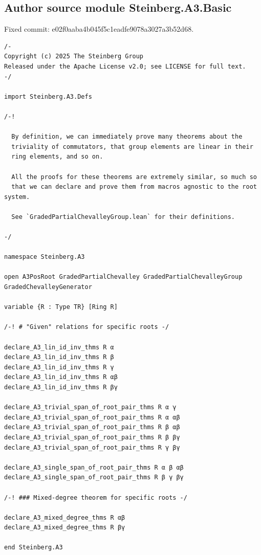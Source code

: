 \subsection*{Author source module Steinberg.A3.Basic}
\noindent Fixed commit: e02f0aaba4b045f5c1eadfe9078a3027a3b52d68.
\begin{Verbatim}
/-
Copyright (c) 2025 The Steinberg Group
Released under the Apache License v2.0; see LICENSE for full text.
-/

import Steinberg.A3.Defs

/-!

  By definition, we can immediately prove many theorems about the
  triviality of commutators, that group elements are linear in their
  ring elements, and so on.

  All the proofs for these theorems are extremely similar, so much so
  that we can declare and prove them from macros agnostic to the root system.

  See `GradedPartialChevalleyGroup.lean` for their definitions.

-/

namespace Steinberg.A3

open A3PosRoot GradedPartialChevalley GradedPartialChevalleyGroup GradedChevalleyGenerator

variable {R : Type TR} [Ring R]

/-! # "Given" relations for specific roots -/

declare_A3_lin_id_inv_thms R α
declare_A3_lin_id_inv_thms R β
declare_A3_lin_id_inv_thms R γ
declare_A3_lin_id_inv_thms R αβ
declare_A3_lin_id_inv_thms R βγ

declare_A3_trivial_span_of_root_pair_thms R α γ
declare_A3_trivial_span_of_root_pair_thms R α αβ
declare_A3_trivial_span_of_root_pair_thms R β αβ
declare_A3_trivial_span_of_root_pair_thms R β βγ
declare_A3_trivial_span_of_root_pair_thms R γ βγ

declare_A3_single_span_of_root_pair_thms R α β αβ
declare_A3_single_span_of_root_pair_thms R β γ βγ

/-! ### Mixed-degree theorem for specific roots -/

declare_A3_mixed_degree_thms R αβ
declare_A3_mixed_degree_thms R βγ

end Steinberg.A3
\end{Verbatim}
